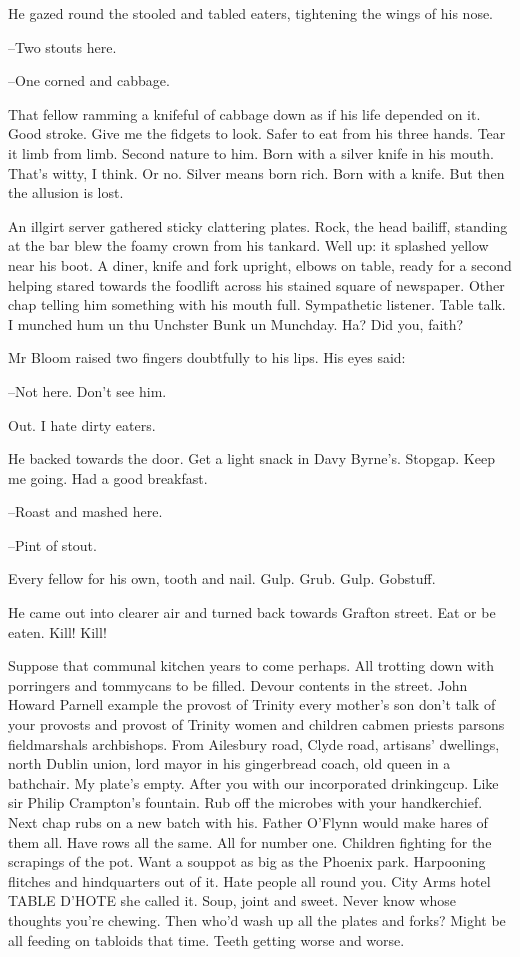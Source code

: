 He gazed round the stooled and tabled eaters, tightening the wings of
his nose.

--Two stouts here.

--One corned and cabbage.

That fellow ramming a knifeful of cabbage down as if his life
depended on it. Good stroke. Give me the fidgets to look. Safer to eat
from his three hands. Tear it limb from limb. Second nature to him. Born
with a silver knife in his mouth. That's witty, I think. Or no. Silver
means born rich. Born with a knife. But then the allusion is lost.

An illgirt server gathered sticky clattering plates. Rock, the head
bailiff, standing at the bar blew the foamy crown from his tankard. Well
up: it splashed yellow near his boot. A diner, knife and fork upright,
elbows on table, ready for a second helping stared towards the foodlift
across his stained square of newspaper. Other chap telling him something
with his mouth full. Sympathetic listener. Table talk. I munched hum un
thu Unchster Bunk un Munchday. Ha? Did you, faith?

Mr Bloom raised two fingers doubtfully to his lips. His eyes said:

--Not here. Don't see him.

Out. I hate dirty eaters.

He backed towards the door. Get a light snack in Davy Byrne's. Stopgap.
Keep me going. Had a good breakfast.

--Roast and mashed here.

--Pint of stout.

Every fellow for his own, tooth and nail. Gulp. Grub. Gulp. Gobstuff.

He came out into clearer air and turned back towards Grafton street.
Eat or be eaten. Kill! Kill!

Suppose that communal kitchen years to come perhaps. All trotting
down with porringers and tommycans to be filled. Devour contents in the
street. John Howard Parnell example the provost of Trinity every mother's
son don't talk of your provosts and provost of Trinity women and children
cabmen priests parsons fieldmarshals archbishops. From Ailesbury road,
Clyde road, artisans' dwellings, north Dublin union, lord mayor in his
gingerbread coach, old queen in a bathchair. My plate's empty. After you
with our incorporated drinkingcup. Like sir Philip Crampton's fountain.
Rub off the microbes with your handkerchief. Next chap rubs on a new
batch with his. Father O'Flynn would make hares of them all. Have rows
all the same. All for number one. Children fighting for the scrapings of
the pot. Want a souppot as big as the Phoenix park. Harpooning flitches
and hindquarters out of it. Hate people all round you. City Arms hotel
TABLE D'HOTE she called it. Soup, joint and sweet. Never know whose
thoughts you're chewing. Then who'd wash up all the plates and forks?
Might be all feeding on tabloids that time. Teeth getting worse and worse.

